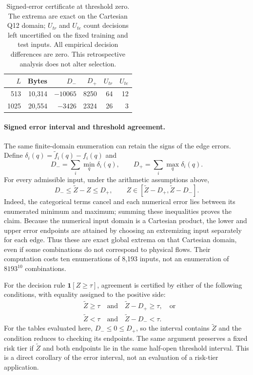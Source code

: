 \begin{table}[t]
\centering\footnotesize\setlength{\tabcolsep}{3pt}
\caption{Signed-error certificate at threshold zero. The extrema are exact on the Cartesian Q12 domain; $U_{tr}$ and $U_{te}$ count decisions left uncertified on the fixed training and test inputs. All empirical decision differences are zero. This retrospective analysis does not alter selection.}
\label{tab:signed_certificate}
\begin{tabular}{rrrrrr}
\toprule
$L$ & Bytes & $D_-$ & $D_+$ & $U_{tr}$ & $U_{te}$\\
\midrule
513 & 10,314 & $-10065$ & 8250 & 64 & 12\\
1025 & 20,554 & $-3426$ & 2324 & 26 & 3\\
\bottomrule
\end{tabular}
\end{table}

\paragraph{Signed error interval and threshold agreement.}
The same finite-domain enumeration can retain the signs of the edge errors.
Define $\delta_i(q)=\widetilde f_i(q)-f_i(q)$ and
\begin{equation}
 D_- = \sum_i\min_q\delta_i(q),\qquad
 D_+ = \sum_i\max_q\delta_i(q).
 \label{eq:signed_error_extrema}
\end{equation}
For every admissible input, under the arithmetic assumptions above,
\begin{equation}
 D_-\leq\widetilde Z-Z\leq D_+,
 \qquad Z\in[\widetilde Z-D_+,\widetilde Z-D_-].
 \label{eq:signed_error_interval}
\end{equation}
Indeed, the categorical terms cancel and each numerical error lies between
its enumerated minimum and maximum; summing these inequalities proves the
claim. Because the numerical input domain is a Cartesian product, the lower
and upper error endpoints are attained by choosing an extremizing input
separately for each edge. Thus these are exact global extrema on that
Cartesian domain, even if some combinations do not correspond to physical
flows. Their computation costs ten enumerations of 8,193 inputs, not an
enumeration of $8193^{10}$ combinations.

For the decision rule $\mathbf1[Z\geq\tau]$, agreement is certified by either
of the following conditions, with equality assigned to the positive side:
\begin{align}
 &\widetilde Z\geq\tau\quad\text{and}\quad\widetilde Z-D_+\geq\tau,
 \quad\text{or}\nonumber\\
 &\widetilde Z<\tau\quad\text{and}\quad\widetilde Z-D_-<\tau.
 \label{eq:signed_threshold_certificate}
\end{align}
For the tables evaluated here, $D_-\leq0\leq D_+$, so the interval contains
$\widetilde Z$ and the condition reduces to checking its endpoints.
The same argument preserves a fixed risk tier if $\widetilde Z$ and both
endpoints lie in the same half-open threshold interval. This is a direct corollary of
the error interval, not an evaluation of a risk-tier application.

